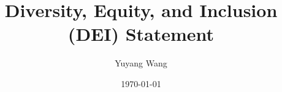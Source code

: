 



\title{Diversity, Equity, and Inclusion (DEI) Statement}
\def\rsCustom{}

\author{Yuyang Wang}
\date{\today}
\makeatletter
\fancyfoot[L]{\scshape \MakeLowercase{\@author}}
\fancyfoot[R]{{\scshape \MakeLowercase{\@title}}\quad{\LARGE\sfrac{\thepage}{\pageref*{LastPage}}}}
\makeatother



\maketitle%
\thispagestyle{fancy}


\rsCustom{}


\footnotesize


